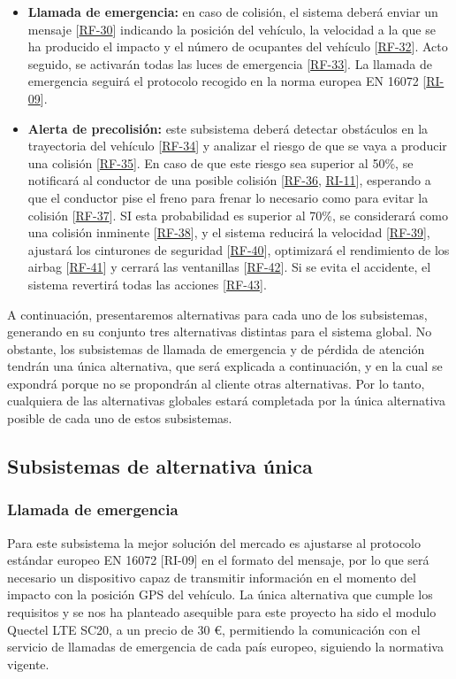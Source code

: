 \begin{itemize}[-]
\item \textbf{Llamada de emergencia:} en caso de colisión, el sistema deberá enviar un mensaje [\hyperref[tab:RF-30]{RF-30}] indicando la posición del vehículo, la velocidad a la que se ha producido el impacto y el número de ocupantes del vehículo [\hyperref[tab:RF-32]{RF-32}]. Acto seguido, se activarán todas las luces de emergencia [\hyperref[tab:RF-33]{RF-33}]. La llamada de emergencia seguirá el protocolo recogido en la norma europea EN 16072 [\hyperref[tab:RI-09]{RI-09}].
\item \textbf{Alerta de precolisión:} este subsistema deberá detectar obstáculos en la trayectoria del vehículo [\hyperref[tab:RF-34]{RF-34}] y analizar el riesgo de que se vaya a producir una colisión [\hyperref[tab:RF-35]{RF-35}]. En caso de que este riesgo sea superior al 50\%, se notificará al conductor de una posible colisión [\hyperref[tab:RF-36]{RF-36}, \hyperref[tab:RI-11]{RI-11}], esperando a que el conductor pise el freno para frenar lo necesario como para evitar la colisión [\hyperref[tab:RF-37]{RF-37}]. SI esta probabilidad es superior al 70\%, se considerará como una colisión inminente [\hyperref[tab:RF-38]{RF-38}], y el sistema reducirá la velocidad [\hyperref[tab:RF-39]{RF-39}], ajustará los cinturones de seguridad [\hyperref[tab:RF-40]{RF-40}], optimizará el rendimiento de los airbag [\hyperref[tab:RF-41]{RF-41}] y cerrará las ventanillas [\hyperref[tab:RF-42]{RF-42}]. Si se evita el accidente, el sistema revertirá todas las acciones [\hyperref[tab:RF-43]{RF-43}].
\end{itemize}

A continuación, presentaremos alternativas para cada uno de los subsistemas, generando en su conjunto tres alternativas distintas para el sistema global. No obstante, los subsistemas de llamada de emergencia y de pérdida de atención tendrán una única alternativa, que será explicada a continuación, y en la cual se expondrá porque no se propondrán al cliente otras alternativas. Por lo tanto, cualquiera de las alternativas globales estará completada por la única alternativa posible de cada uno de estos subsistemas.

\subsection{Subsistemas de alternativa única}
\subsubsection{Llamada de emergencia}
\par Para este subsistema  la mejor solución del mercado es ajustarse al protocolo estándar europeo EN 16072 [RI-09] en el formato del mensaje, por lo que será necesario un dispositivo capaz de transmitir información en el momento del impacto con la posición GPS del vehículo. La única alternativa que cumple los requisitos y se nos ha planteado asequible para este proyecto ha sido el modulo Quectel LTE SC20, a un precio de 30 \euro,  permitiendo la comunicación con el servicio de llamadas de emergencia de cada país europeo, siguiendo la normativa vigente.

